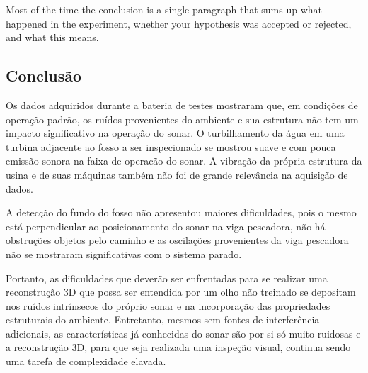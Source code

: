 

Most of the time the conclusion is a single paragraph that sums up what happened in the experiment, whether your hypothesis was accepted or rejected, and what this means.


\subsection{Conclusão}

Os dados adquiridos durante a bateria de testes mostraram que, em condições de
operação padrão, os ruídos provenientes do ambiente e sua estrutura não tem
um impacto significativo na operação do sonar. O turbilhamento da água em uma
turbina adjacente ao fosso a ser inspecionado se mostrou suave e com pouca
emissão sonora na faixa de operacão do sonar. A vibração da própria
estrutura da usina e de suas máquinas também não foi de grande relevância na aquisição de dados.

A detecção do fundo do fosso não apresentou maiores dificuldades, pois o mesmo
está perpendicular ao posicionamento do sonar na viga pescadora, não há
obstruções objetos pelo caminho e as oscilações provenientes da viga pescadora
não se mostraram significativas com o sistema parado.

Portanto, as dificuldades que deverão ser enfrentadas para se realizar uma
reconstrução 3D que possa ser entendida por um olho não treinado se depositam 
nos ruídos intrínsecos do próprio sonar e na incorporação das propriedades
estruturais do ambiente. Entretanto, mesmos sem fontes de
interferência adicionais, as características já conhecidas do sonar são por si
só muito ruidosas e a reconstrução 3D, para que seja realizada uma inspeção
visual, continua sendo uma tarefa de complexidade elavada.

